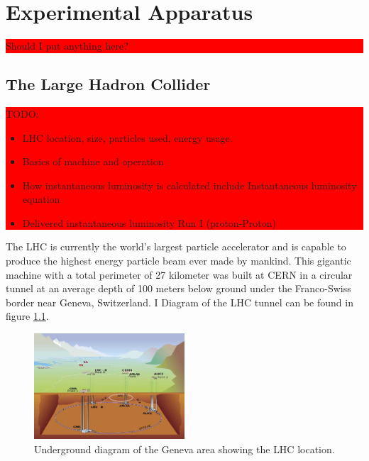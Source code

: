 \chapter{Experimental Apparatus}
\label{CHAPTER:ExperimentalApparatus}

\colorbox{red}{
\begin{minipage}{0.95\linewidth}
Should I put anything here?
\end{minipage}
}


\section{The Large Hadron Collider}
\label{SECTION:ExperimentalApparatus_LHC}

\colorbox{red}{
\begin{minipage}{0.95\linewidth}
TODO: 

\begin{itemize}
  \item LHC location, size, particles used, energy usage.
  \item Basics of machine and operation
  \item How instantaneous luminosity is calculated include Instantaneous luminosity equation
  \item Delivered instantaneous luminosity Run I (proton-Proton)
\end{itemize}

\end{minipage}
}

The \gls{LHC} \cite{ARTICLE:LHC Machine} is currently the world's largest particle accelerator and is capable to produce the highest energy particle beam ever made by mankind. This gigantic machine with a total perimeter of 27 kilometer was built at \gls{CERN} in a circular tunnel at an average depth of 100 meters below ground under the Franco-Swiss border near Geneva, Switzerland. I Diagram of the LHC tunnel can be found in figure \ref{FIGURE:ExperimentalApparatus_LHCLayoutUnderground}.

\begin{figure}[!htb]
  \centering
  \includegraphics[width=0.50\textwidth]{Chapter02/Images/LHC_layout_underground.jpg}
  \caption{Underground diagram of the Geneva area showing the \gls{LHC} location.}
  \label{FIGURE:ExperimentalApparatus_LHCLayoutUnderground}
\end{figure}

